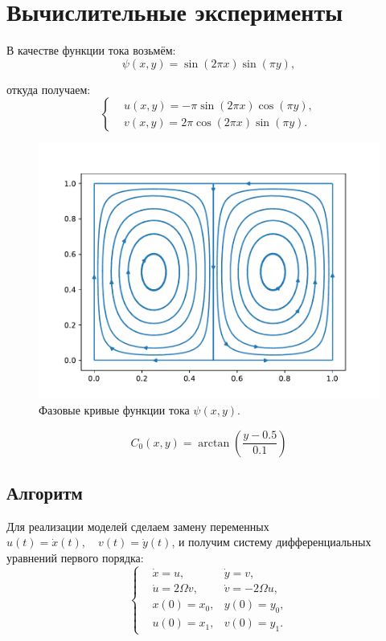 \section{Вычислительные эксперименты}
    В качестве функции тока возьмём:
    \[
        \psi(x, y) = \sin (2 \pi x) \sin(\pi y),
    \]

    откуда получаем:
    \[
        \left\{
            \begin{split}
                & u(x, y) = -\pi \sin (2 \pi x) \cos(\pi y), \\
                & v(x, y) = 2\pi \cos (2 \pi x) \sin(\pi y).
            \end{split}
        \right.
    \]

    \begin{figure}[H]
        \centering
        \includegraphics[width=12cm]{pictures/streamplot.pdf}
        \caption{Фазовые кривые функции тока \( \psi(x, y) \).}
    \end{figure}

    \[
        C_0(x, y) = \arctan \left( \frac{y - 0.5}{0.1} \right)
    \]

    \subsection{Алгоритм}
        Для реализации моделей сделаем замену переменных \( u(t) = \dot{x}(t), \quad v(t) = \dot{y}(t) \), и получим систему дифференциальных уравнений первого порядка:
        \[
            \left\{\begin{split}
                & \dot{x} = u, & \dot{y} = v, \\
                & \dot{u} = 2 \Omega v, & \dot{v} = -2 \Omega u, \\
                & x(0) = x_0, & y(0) = y_0, \\
                & u(0) = x_1, & v(0) = y_1.
            \end{split}\right.
        \]

